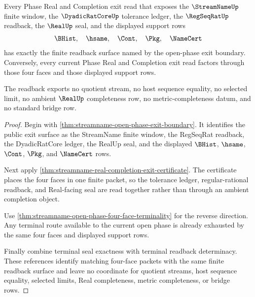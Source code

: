 \begin{theorem}
\label{thm:streamname-open-phase-four-face-exit-readback}
Every Phase Real and Completion exit read that exposes the $\StreamNameUp$ finite window, the $\DyadicRatCoreUp$ tolerance ledger, the $\RegSeqRatUp$ readback, the $\RealUp$ seal, and the displayed support rows
$$
\BHist,\quad \hsame,\quad \Cont,\quad \Pkg,\quad \NameCert
$$
has exactly the finite readback surface named by the open-phase exit boundary. Conversely, every current Phase Real and Completion exit read factors through those four faces and those displayed support rows.

The readback exports no quotient stream, no host sequence equality, no selected limit, no ambient $\RealUp$ completeness row, no metric-completeness datum, and no standard bridge row.
\end{theorem}
\begin{proof}
Begin with \autoref{thm:streamname-open-phase-exit-boundary}. It identifies the public exit surface as the StreamName finite window, the RegSeqRat readback, the DyadicRatCore ledger, the RealUp seal, and the displayed $\BHist$, $\hsame$, $\Cont$, $\Pkg$, and $\NameCert$ rows.

Next apply \autoref{thm:streamname-real-completion-exit-certificate}. The certificate places the four faces in one finite packet, so the tolerance ledger, regular-rational readback, and Real-facing seal are read together rather than through an ambient completion object.

Use \autoref{thm:streamname-open-phase-four-face-terminality} for the reverse direction. Any terminal route available to the current open phase is already exhausted by the same four faces and displayed support rows.

Finally combine terminal seal exactness with terminal readback determinacy. These references identify matching four-face packets with the same finite readback surface and leave no coordinate for quotient streams, host sequence equality, selected limits, Real completeness, metric completeness, or bridge rows.
\end{proof}

